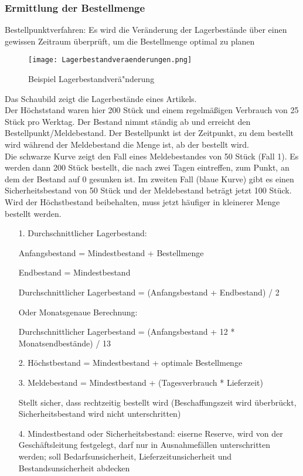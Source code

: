 \documentclass[asp1.tex]{subfiles}
\begin{document}
\subsubsection{Ermittlung der Bestellmenge}
Bestellpunktverfahren:
Es wird die Veränderung der Lagerbestände über einen gewissen Zeitraum überprüft, um die Bestellmenge optimal zu planen

\begin{figure}[H]
    \begin{center}
        \texttt{[image: Lagerbestandveraenderungen.png]}
    \end{center}
    \caption{Beispiel Lagerbestandver\"a"nderung}
    \label{fig:Lagerbestandveränderung}
\end{figure}

Das Schaubild zeigt die Lagerbestände eines Artikels. \\
Der Höchststand waren hier 200 Stück und einem regelmäßigen Verbrauch von 25 Stück pro Werktag. Der Bestand nimmt ständig ab und erreicht den Bestellpunkt/Meldebestand. Der Bestellpunkt ist der Zeitpunkt, zu dem bestellt wird während der Meldebestand die Menge ist, ab der  bestellt wird.\\
Die schwarze Kurve zeigt den Fall eines Meldebestandes von 50 Stück (Fall 1). Es werden dann 200 Stück bestellt, die nach zwei Tagen eintreffen, zum Punkt, an dem der Bestand auf 0 gesunken ist.
Im zweiten Fall (blaue Kurve) gibt es einen Sicherheitsbestand von 50 Stück und der Meldebestand beträgt jetzt 100 Stück. Wird der Höchstbestand beibehalten, muss jetzt häufiger in kleinerer Menge bestellt werden.


\begin{itemize}
    \item[1.]Durchschnittlicher Lagerbestand:
    \item[]Anfangsbestand = Mindestbestand + Bestellmenge
    \item[]Endbestand = Mindestbestand
    \item[]Durchschnittlicher Lagerbestand = (Anfangsbestand + Endbestand) / 2
    \item[]Oder Monatsgenaue Berechnung:
    \item[]Durchschnittlicher Lagerbestand = (Anfangsbestand + 12 * Monatsendbestände) / 13

    \item[2.]	Höchstbestand = Mindestbestand + optimale Bestellmenge
    \item[3.]	Meldebestand = Mindestbestand + (Tagesverbrauch * Lieferzeit)                 \item[]Stellt sicher, dass rechtzeitig bestellt wird (Beschaffungszeit wird überbrückt, Sicherheitsbestand wird nicht unterschritten)
    \item[4.]	Mindestbestand oder Sicherheitsbestand: eiserne Reserve, wird von der Geschäftsleitung festgelegt, darf nur in Ausnahmefällen unterschritten werden; soll Bedarfsunsicherheit, Lieferzeitunsicherheit und Bestandsunsicherheit abdecken

\end{itemize}
\end{document}
